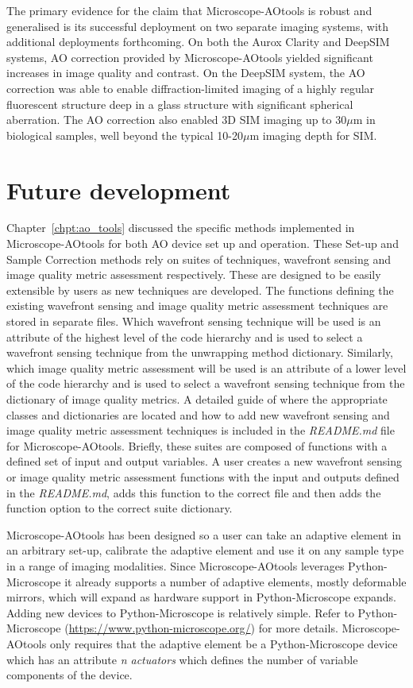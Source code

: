 The primary evidence for the claim that Microscope-AOtools is robust and 
generalised is its successful deployment on two separate imaging systems, 
with additional deployments forthcoming. On both the Aurox Clarity and 
DeepSIM systems, AO correction provided by Microscope-AOtools yielded 
significant increases in image quality and contrast. On the DeepSIM system, 
the AO correction was able to enable diffraction-limited imaging of a highly 
regular fluorescent structure deep in a glass structure with
significant spherical aberration. The AO correction 
also enabled 3D SIM imaging up to 30$\mu$m in biological samples, well beyond 
the typical 10-20$\mu$m imaging depth for 
SIM\cite{schermelleh2019super,wu2018faster}. 

\section{Future development}
\label{sec:future_dev}

Chapter~\ref{chpt:ao_tools} discussed the specific methods implemented in 
Microscope-AOtools for both AO device set up and operation. These Set-up 
and  Sample Correction methods rely on suites of techniques, wavefront 
sensing and image quality metric assessment respectively. These are 
designed to be easily extensible by users as new techniques are developed. 
The functions defining the existing wavefront sensing and image quality 
metric assessment techniques are stored in separate files. Which wavefront 
sensing technique will be used is an attribute of the highest level
of the code hierarchy and is used to select a wavefront sensing technique 
from the unwrapping method dictionary. Similarly, which image quality 
metric assessment will be used is an attribute of a lower level	of the 
code hierarchy and is used to select a wavefront sensing technique from 
the dictionary of image quality metrics. A detailed guide of where the 
appropriate classes and dictionaries are located and how to add new 
wavefront sensing and image quality metric assessment techniques is 
included in the \textit{README.md} file for Microscope-AOtools. Briefly, 
these suites are composed of functions with a defined set of input and 
output variables. A user creates a new wavefront sensing or image 
quality metric assessment functions with the input and outputs defined 
in the \textit{README.md}, adds this function to the correct file and 
then adds the function option to the correct suite dictionary.

Microscope-AOtools has been designed so a user can take an adaptive element 
in an arbitrary set-up, calibrate the adaptive element and use it on any 
sample type in a range of imaging modalities. Since Microscope-AOtools 
leverages Python-Microscope it already supports a number of adaptive 
elements, mostly deformable mirrors, which will expand as hardware support 
in Python-Microscope expands. Adding new devices to Python-Microscope is 
relatively simple. Refer to Python-Microscope 
(\url{https://www.python-microscope.org/}) for more details. 
Microscope-AOtools only requires that the adaptive element be a 
Python-Microscope device which has an attribute \textit{n\textunderscore 
	actuators} which defines the number of variable components of the device.

